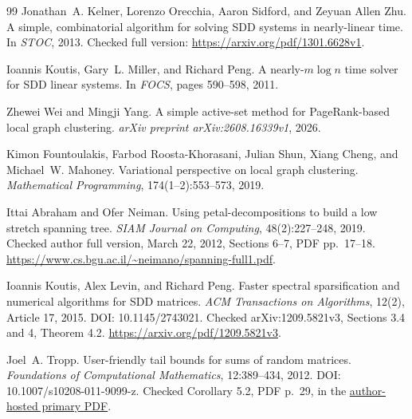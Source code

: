 \begin{thebibliography}{99}
Jonathan~A. Kelner, Lorenzo Orecchia, Aaron Sidford, and Zeyuan Allen Zhu.
\newblock A simple, combinatorial algorithm for solving SDD systems in nearly-linear time.
\newblock In \emph{STOC}, 2013.
\newblock Checked full version: \url{https://arxiv.org/pdf/1301.6628v1}.

Ioannis Koutis, Gary~L. Miller, and Richard Peng.
\newblock A nearly-$m\log n$ time solver for SDD linear systems.
\newblock In \emph{FOCS}, pages 590--598, 2011.

Zhewei Wei and Mingji Yang.
\newblock A simple active-set method for PageRank-based local graph clustering.
\newblock \emph{arXiv preprint arXiv:2608.16339v1}, 2026.

Kimon Fountoulakis, Farbod Roosta-Khorasani, Julian Shun, Xiang Cheng, and
Michael~W. Mahoney.
\newblock Variational perspective on local graph clustering.
\newblock \emph{Mathematical Programming}, 174(1--2):553--573, 2019.


Ittai Abraham and Ofer Neiman.
\newblock Using petal-decompositions to build a low stretch spanning tree.
\newblock \emph{SIAM Journal on Computing}, 48(2):227--248, 2019.
\newblock Checked author full version, March 22, 2012, Sections 6--7,
PDF pp.\ 17--18. \url{https://www.cs.bgu.ac.il/~neimano/spanning-full1.pdf}.

Ioannis Koutis, Alex Levin, and Richard Peng.
\newblock Faster spectral sparsification and numerical algorithms for SDD matrices.
\newblock \emph{ACM Transactions on Algorithms}, 12(2), Article 17, 2015.
\newblock DOI: 10.1145/2743021. Checked arXiv:1209.5821v3,
Sections 3.4 and 4, Theorem 4.2. \url{https://arxiv.org/pdf/1209.5821v3}.

Joel~A. Tropp.
\newblock User-friendly tail bounds for sums of random matrices.
\newblock \emph{Foundations of Computational Mathematics}, 12:389--434, 2012.
\newblock DOI: 10.1007/s10208-011-9099-z. Checked Corollary 5.2,
PDF p.\ 29, in the
\href{https://users.cms.caltech.edu/~jtropp/papers/Tro11-User-Friendly-FOCM.pdf}{author-hosted primary PDF}.


\end{thebibliography}
